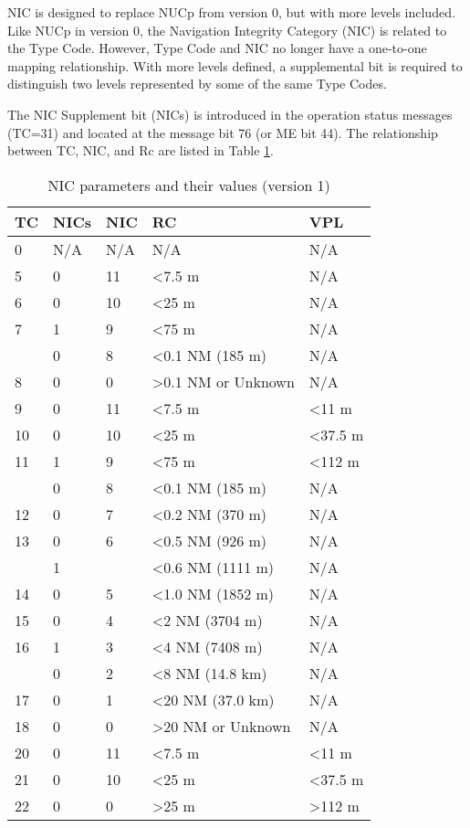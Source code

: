 NIC is designed to replace NUCp from version 0, but with more levels included. Like NUCp in version 0, the Navigation Integrity Category (NIC) is related to the Type Code. However, Type Code and NIC no longer have a one-to-one mapping relationship. With more levels defined, a supplemental bit is required to distinguish two levels represented by some of the same Type Codes.

The NIC Supplement bit (NICs) is introduced in the operation status messages (TC=31) and located at the message bit 76 (or ME bit 44). The relationship between TC, NIC, and Rc are listed in Table \ref{tb:nic-params-v1}.

\begin{table}[!ht]
\caption{NIC parameters and their values (version 1)}
\label{tb:nic-params-v1}
\begin{tabular}{|l|l|l|l|l|}
\hline
\textbf{TC} & \textbf{NICs} & \textbf{NIC} & \textbf{RC} & \textbf{VPL} \\ \hline \hline
0 & N/A & N/A & N/A & N/A \\ \hline
5 & 0 & 11 & \textless 7.5 m & N/A \\ \hline
6 & 0 & 10 & \textless 25 m & N/A \\ \hline
7 & 1 & 9 & \textless 75 m & N/A \\ \cline{2-5}
 & 0 & 8 & \textless 0.1 NM (185 m) & N/A \\ \hline
8 & 0 & 0 & \textgreater 0.1 NM or Unknown & N/A \\ \hline
\hline
9 & 0 & 11 & \textless 7.5 m & \textless 11 m \\ \hline
10 & 0 & 10 & \textless 25 m & \textless 37.5 m \\ \hline
11 & 1 & 9 & \textless 75 m & \textless 112 m \\ \cline{2-5}
 & 0 & 8 & \textless 0.1 NM (185 m) & N/A \\ \hline
12 & 0 & 7 & \textless 0.2 NM (370 m) & N/A \\ \hline
13 & 0 & 6 & \textless 0.5 NM (926 m) & N/A \\ \cline{2-2} \cline{4-5}
 & 1 &  & \textless 0.6 NM (1111 m) & N/A \\ \hline
14 & 0 & 5 & \textless 1.0 NM (1852 m) & N/A \\ \hline
15 & 0 & 4 & \textless 2 NM (3704 m) & N/A \\ \hline
16 & 1 & 3 & \textless 4 NM (7408 m) & N/A \\ \cline{2-5}
 & 0 & 2 & \textless 8 NM (14.8 km) & N/A \\ \hline
17 & 0 & 1 & \textless 20 NM (37.0 km) & N/A \\ \hline
18 & 0 & 0 & \textgreater 20 NM or Unknown & N/A \\ \hline
\hline
20 & 0 & 11 & \textless 7.5 m & \textless 11 m \\ \hline
21 & 0 & 10 & \textless 25 m & \textless 37.5 m \\ \hline
22 & 0 & 0 & \textgreater 25 m & \textgreater 112 m \\ \hline
\end{tabular}
\end{table}

